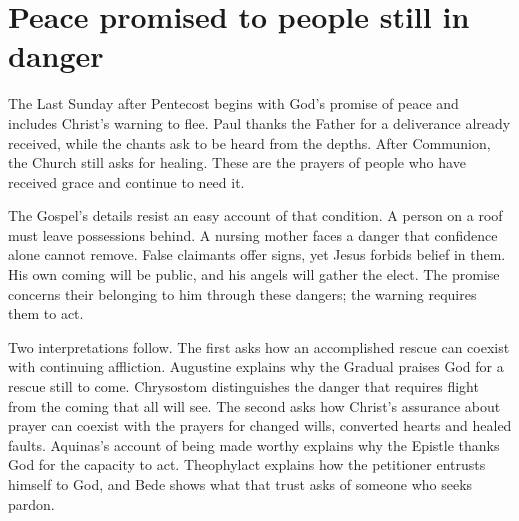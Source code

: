 \section{Peace promised to people still in danger}

The Last Sunday after Pentecost begins with God's promise of peace and
includes Christ's warning to flee. Paul thanks the Father for a deliverance
already received, while the chants ask to be heard from the depths. After
Communion, the Church still asks for healing. These are the prayers of
people who have received grace and continue to need it.

The Gospel's details resist an easy account of that condition. A person on a
roof must leave possessions behind. A nursing mother faces a danger that
confidence alone cannot remove. False claimants offer signs, yet Jesus
forbids belief in them. His own coming will be public, and his angels will
gather the elect. The promise concerns their belonging to him through
these dangers; the warning requires them to act.

Two interpretations follow. The first asks how an accomplished rescue can
coexist with continuing affliction. Augustine explains why the Gradual
praises God for a rescue still to come. Chrysostom distinguishes the
danger that requires flight from the coming that all will see.
The second asks how
Christ's assurance about prayer can coexist with the prayers for changed
wills, converted hearts and healed faults. Aquinas's account of being
made worthy explains why the Epistle thanks God for the capacity to
act. Theophylact explains how the petitioner entrusts himself to God,
and Bede shows what that trust asks of someone who seeks pardon.

